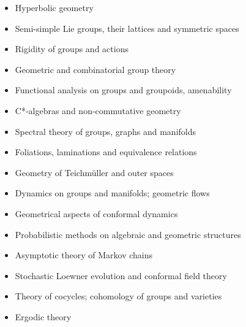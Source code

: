 \begin{itemize}

\item

Hyperbolic geometry

\item

Semi-simple Lie groups, their lattices and symmetric spaces

\item

Rigidity of groups and actions

\item

Geometric and combinatorial group theory

\item

Functional analysis on groups and groupoids, amenability

\item

C*-algebras and non-commutative geometry

\item

Spectral theory of groups, graphs and manifolds

\item

Foliations, laminations and equivalence relations

\item

Geometry of Teichm\"{u}ller and outer spaces

\item

Dynamics on groups and manifolds; geometric flows

\item

Geometrical aspects of conformal dynamics

\item

Probabilistic methods on algebraic and geometric structures

\item

Asymptotic theory of Markov chains

\item

Stochastic Loewner evolution and conformal field theory

\item

Theory of cocycles; cohomology of groups and varieties

\item

Ergodic theory

\end{itemize}



